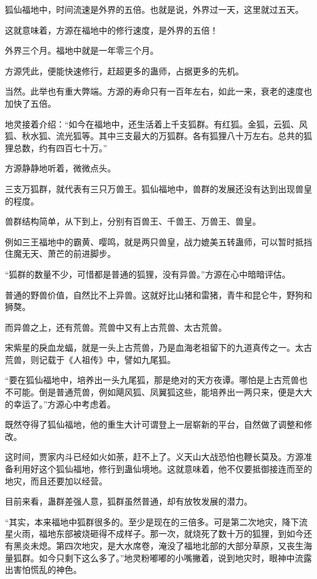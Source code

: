 \begin{this_body}
狐仙福地中，时间流速是外界的五倍。也就是说，外界过一天，这里就过五天。

这就意味着，方源在福地中的修行速度，是外界的五倍！

外界三个月。福地中就是一年零三个月。

方源凭此，便能快速修行，赶超更多的蛊师，占据更多的先机。

当然。此举也有重大弊端。方源的寿命只有一百年左右，如此一来，衰老的速度也加快了五倍。

地灵接着介绍：“如今在福地中，还生活着上千支狐群。有红狐。金狐，云狐、风狐、秋水狐、流光狐等。其中三支最大的万狐群。各有狐狸八十万左右。总共的狐狸总数，约有四百七十万。”

方源静静地听着，微微点头。

三支万狐群，就代表有三只万兽王。狐仙福地中，兽群的发展还没有达到出现兽皇的程度。

兽群结构简单，从下到上，分别有百兽王、千兽王、万兽王、兽皇。

例如三王福地中的霸黄、嘤鸣，就是两只兽皇，战力媲美五转蛊师，可以暂时抵挡住魔无天、萧芒的前进脚步。

“狐群的数量不少，可惜都是普通的狐狸，没有异兽。”方源在心中暗暗评估。

普通的野兽价值，自然比不上异兽。这就好比山猪和雷猪，青牛和昆仑牛，野狗和狮獒。

而异兽之上，还有荒兽。荒兽中又有上古荒兽、太古荒兽。

宋紫星的戾血龙蝠，就是一头上古荒兽，乃是血海老祖留下的九道真传之一。太古荒兽，则记载于《人祖传》中，譬如九尾狐。

“要在狐仙福地中，培养出一头九尾狐，那是绝对的天方夜谭。哪怕是上古荒兽也不可能。倒是普通荒兽，例如飓风狐、凤翼狐这些，能培养出一两只来，便是大大的幸运了。”方源心中考虑着。

既然夺得了狐仙福地，他的重生大计可谓登上一层崭新的平台，自然做了调整和修改。

这时间，贾家内斗已经如火如荼，赶不上了。义天山大战恐怕也鞭长莫及。方源准备利用好这个狐仙福地，修行到蛊仙境地。这就意味着，他不仅要抵御接连而至的地灾，而且还要加以经营。

目前来看，蛊群差强人意，狐群虽然普通，却有放牧发展的潜力。

“其实，本来福地中狐群很多的。至少是现在的三倍多。可是第二次地灾，降下流星火雨，福地东部被烧砸得不成样子。那一次，就烧死了数十万的狐狸，到如今还有黑炎未熄。第四次地灾，是大水席卷，淹没了福地北部的大部分草原，又丧生海量狐群。如今只剩下这么多了。”地灵粉嘟嘟的小嘴撇着，说到地灾时，眼神中流露出害怕慌乱的神色。


\end{this_body}

